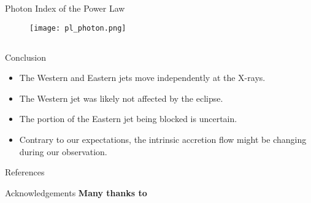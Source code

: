 \documentclass{beamer}
\begin{document}
\begin{frame}{Photon Index of the Power Law}
            \begin{figure}
                \centering
                \texttt{[image: pl\_photon.png]}
                \label{photon_pl}
            \end{figure}
\end{frame}






\subsection{}
\normalsize
\begin{frame}{Conclusion}
\begin{itemize}
    \item The Western and Eastern jets move independently at the X-rays.
    \item The Western jet was likely not affected by the eclipse.
    \item The portion of the Eastern jet being blocked is uncertain.
    \item Contrary to our expectations, the intrinsic accretion flow might be changing during our observation.
\end{itemize}
\end{frame}


\begin{frame}{References}
    
\end{frame}

\begin{frame}{Acknowledgements}
\textbf{Many thanks to} 


\end{frame}




    
\end{document}

